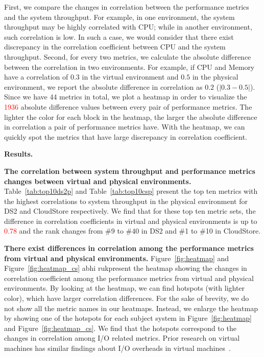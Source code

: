 First, we compare the changes in correlation between the performance metrics and the system throughput. For example, in one environment, the system throughput may be highly correlated with CPU; while in another environment, such correlation is low. In such a case, we would consider that there exist discrepancy in the correlation coefficient between CPU and the system throughput. Second, for every two metrics, we calculate the absolute difference between the correlation in two environments. For example, if CPU and Memory have a correlation of $0.3$ in the virtual environment and $0.5$ in the physical environment, we report the absolute difference in correlation as $0.2$ ($|0.3-0.5|$). Since we have 44 metrics in total, we plot a heatmap in order to visualize the \textcolor{red}{1936} absolute difference values between every pair of performance metrics. The lighter the color for each block in the heatmap, the larger the absolute difference in correlation a pair of performance metrics have. With the heatmap, we can quickly spot the metrics that have large discrepancy in correlation coefficient. 


\noindent \textbf{Results.}



\noindent \textbf{The correlation between system throughput and performance metrics changes between virtual and physical environments.} Table~\ref{tab:top10ds2p} and  Table~\ref{tab:top10csp} present the top ten metrics with the highest correlations to system throughput in the physical environment for DS2 and CloudStore respectively. We find that for these top ten metric sets, the difference in correlation coefficients in virtual and physical environments is up to \textcolor{red}{0.78} and the rank changes from \#9 to \#40 in DS2 and \#1 to \#10 in CloudStore.

\noindent \textbf{There exist differences in correlation among the performance metrics from virtual and physical environments.} Figure~\ref{fig:heatmap} and Figure~\ref{fig:heatmap_cs} {\tiny abhi ruk}present the heatmap showing the changes in correlation coefficient among the performance metrics from virtual and physical environments. By looking at the heatmap, we can find hotspots (with lighter color), which have larger correlation differences. For the sake of brevity, we do not show all the metric names in our heatmaps. Instead, we enlarge the heatmap by showing one of the hotspots for each subject system in Figure~\ref{fig:heatmap} and Figure~\ref{fig:heatmap_cs}. We find that the hotspots correspond to the changes in correlation among I/O related metrics. Prior research on virtual machines has similar findings about I/O overheads in virtual machines~\cite{menon2005diagnosing,kraft2011io}.

